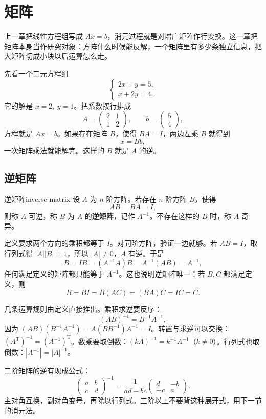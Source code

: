 \section{矩阵}

上一章把线性方程组写成 \(Ax=b\)，消元过程就是对增广矩阵作行变换。这一章把矩阵本身当作研究对象：方阵什么时候能反解，一个矩阵里有多少条独立信息，把大矩阵切成小块以后运算怎么走。

先看一个二元方程组
\[
\begin{cases}
2x+y=5,\\
x+2y=4.
\end{cases}
\]
它的解是 \(x=2,\ y=1\)。把系数按行排成
\[
A=\begin{pmatrix}2&1\\1&2\end{pmatrix},\qquad
b=\begin{pmatrix}5\\4\end{pmatrix},
\]
方程就是 \(Ax=b\)。如果存在矩阵 \(B\)，使得 \(BA=I\)，两边左乘 \(B\) 就得到
\[
x=Bb,
\]
一次矩阵乘法就能解完。这样的 \(B\) 就是 \(A\) 的逆。

\subsection{逆矩阵}

\begin{mydef}{逆矩阵}{inverse-matrix}
设 \(A\) 为 \(n\) 阶方阵。若存在 \(n\) 阶方阵 \(B\)，使得
\[
AB=BA=I,
\]
则称 \(A\) 可逆，称 \(B\) 为 \(A\) 的\textbf{逆矩阵}，记作 \(A^{-1}\)。不存在这样的 \(B\) 时，称 \(A\) 奇异。
\end{mydef}

定义要求两个方向的乘积都等于 \(I\)。对同阶方阵，验证一边就够。若 \(AB=I\)，取行列式得 \(|A||B|=1\)，所以 \(|A|\neq0\)，\(A\) 有逆。于是
\[
B=IB=(A^{-1}A)B=A^{-1}(AB)=A^{-1},
\]
任何满足定义的矩阵都只能等于 \(A^{-1}\)。这也说明逆矩阵唯一：若 \(B,C\) 都满足定义，则
\[
B=BI=B(AC)=(BA)C=IC=C.
\]

几条运算规则由定义直接推出。乘积求逆要反序：
\[
(AB)^{-1}=B^{-1}A^{-1},
\]
因为 \((AB)(B^{-1}A^{-1})=A(BB^{-1})A^{-1}=I\)。转置与求逆可以交换：\((A^{\mathrm T})^{-1}=(A^{-1})^{\mathrm T}\)。数乘要取倒数：\((kA)^{-1}=k^{-1}A^{-1}\)（\(k\neq0\)）。行列式也取倒数：\(|A^{-1}|=|A|^{-1}\)。

二阶矩阵的逆有现成公式：
\[
\begin{pmatrix}a&b\\c&d\end{pmatrix}^{-1}
=\frac{1}{ad-bc}\begin{pmatrix}d&-b\\-c&a\end{pmatrix}.
\]
主对角互换，副对角变号，再除以行列式。三阶以上不要背这种展开式，用下一节的消元法。

